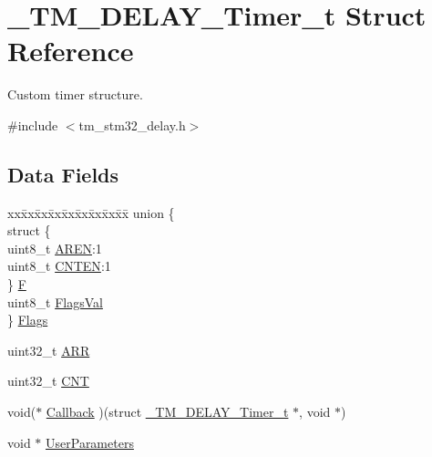 \hypertarget{struct___t_m___d_e_l_a_y___timer__t}{}\section{\+\_\+\+T\+M\+\_\+\+D\+E\+L\+A\+Y\+\_\+\+Timer\+\_\+t Struct Reference}
\label{struct___t_m___d_e_l_a_y___timer__t}


Custom timer structure.  




{\ttfamily \#include $<$tm\+\_\+stm32\+\_\+delay.\+h$>$}

\subsection*{Data Fields}
\begin{DoxyCompactItemize}
\item 
\begin{tabbing}
xx\=xx\=xx\=xx\=xx\=xx\=xx\=xx\=xx\=\kill
union \{\\
\>struct \{\\
\>\>uint8\_t \hyperlink{struct___t_m___d_e_l_a_y___timer__t_a1f3bc377ac159922473d6c06f1c73522}{AREN}:1\\
\>\>uint8\_t \hyperlink{struct___t_m___d_e_l_a_y___timer__t_acf0c4d077f4631ab0190a58c614dbfca}{CNTEN}:1\\
\>\} \hyperlink{struct___t_m___d_e_l_a_y___timer__t_a40b6046972a42f803c4419f2e38f03aa}{F}\\
\>uint8\_t \hyperlink{struct___t_m___d_e_l_a_y___timer__t_aa65211e90cc3a0081998ef3d562980bd}{FlagsVal}\\
\} \hyperlink{struct___t_m___d_e_l_a_y___timer__t_a6beb9f090d6c112ed5506fdf284f82bc}{Flags}\\

\end{tabbing}\item 
uint32\+\_\+t \hyperlink{struct___t_m___d_e_l_a_y___timer__t_a28d91cd581c439f87c95362664933101}{A\+RR}
\item 
uint32\+\_\+t \hyperlink{struct___t_m___d_e_l_a_y___timer__t_af853003aa6db01a3b266193fbc48ac65}{C\+NT}
\item 
void($\ast$ \hyperlink{struct___t_m___d_e_l_a_y___timer__t_ae32cf4569f33c997d7498f037aea8d9e}{Callback} )(struct \hyperlink{struct___t_m___d_e_l_a_y___timer__t}{\+\_\+\+T\+M\+\_\+\+D\+E\+L\+A\+Y\+\_\+\+Timer\+\_\+t} $\ast$, void $\ast$)
\item 
void $\ast$ \hyperlink{struct___t_m___d_e_l_a_y___timer__t_acdb9175c7724f3bc7df957dab22d913f}{User\+Parameters}
\end{DoxyCompactItemize}


